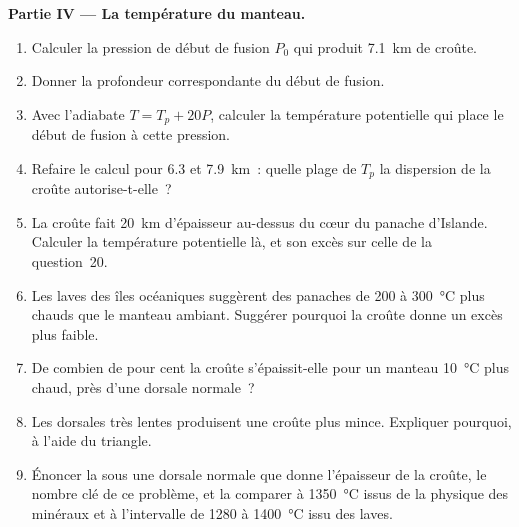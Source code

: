 \begin{problem}
\noindent\textbf{Partie IV --- La température du manteau.}
\begin{enumerate}[resume]
\item Calculer la pression de début de fusion $P_0$ qui produit \qty{7.1}{km} de croûte.
\item Donner la profondeur correspondante du début de fusion.
\item Avec l'adiabate $T = T_p + 20P$, calculer la température potentielle qui
place le début de fusion à cette pression.
\item Refaire le calcul pour 6.3 et \qty{7.9}{km}~: quelle plage de $T_p$ la dispersion de la
croûte autorise-t-elle~?
\item La croûte fait \qty{20}{km} d'épaisseur au-dessus du cœur du panache d'Islande. Calculer
la température potentielle là, et son excès sur celle de la question~20.
\item Les laves des îles océaniques suggèrent des panaches de 200 à \qty{300}{\celsius} plus chauds que
le manteau ambiant. Suggérer pourquoi la croûte donne un excès plus faible.
\item De combien de pour cent la croûte s'épaissit-elle pour un manteau \qty{10}{\celsius}
plus chaud, près d'une dorsale normale~?
\item Les dorsales très lentes produisent une croûte plus mince. Expliquer pourquoi, à l'aide du triangle.
\item Énoncer la  sous une dorsale normale que donne l'épaisseur
de la croûte, le nombre clé de ce problème, et la comparer
à \qty{1350}{\celsius} issus de la physique des minéraux
et à l'intervalle de 1280 à \qty{1400}{\celsius} issu des laves.
\end{enumerate}
\end{problem}
